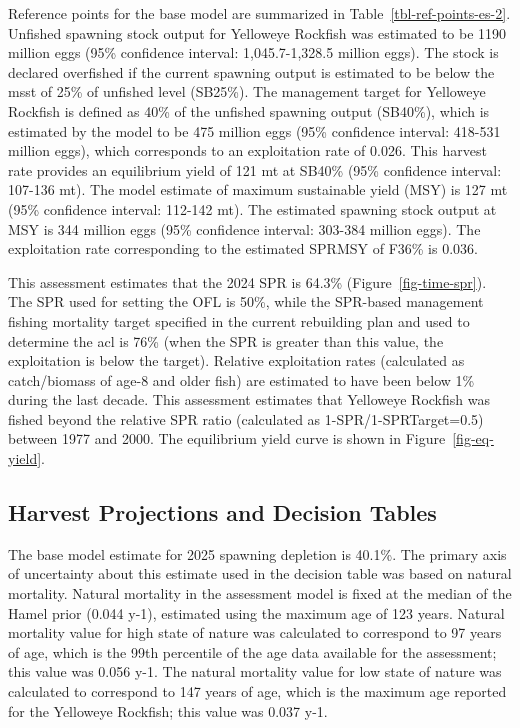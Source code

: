 \documentclass[
]{scrartcl}
\begin{document}
Reference points for the base model are summarized in
Table~\ref{tbl-ref-points-es-2}. Unfished spawning stock output for
Yelloweye Rockfish was estimated to be 1190 million eggs (95\%
confidence interval: 1,045.7-1,328.5 million eggs). The stock is
declared overfished if the current spawning output is estimated to be
below the \gls{msst} of 25\% of unfished level (SB25\%). The management
target for Yelloweye Rockfish is defined as 40\% of the unfished
spawning output (SB40\%), which is estimated by the model to be 475
million eggs (95\% confidence interval: 418-531 million eggs), which
corresponds to an exploitation rate of 0.026. This harvest rate provides
an equilibrium yield of 121 mt at SB40\% (95\% confidence interval:
107-136 mt). The model estimate of maximum sustainable yield (MSY) is
127 mt (95\% confidence interval: 112-142 mt). The estimated spawning
stock output at MSY is 344 million eggs (95\% confidence interval:
303-384 million eggs). The exploitation rate corresponding to the
estimated SPRMSY of F36\% is 0.036.

This assessment estimates that the 2024 SPR is 64.3\%
(Figure~\ref{fig-time-spr}). The SPR used for setting the OFL is 50\%,
while the SPR-based management fishing mortality target specified in the
current rebuilding plan and used to determine the \gls{acl} is 76\%
(when the SPR is greater than this value, the exploitation is below the
target). Relative exploitation rates (calculated as catch/biomass of
age-8 and older fish) are estimated to have been below 1\% during the
last decade. This assessment estimates that Yelloweye Rockfish was
fished beyond the relative SPR ratio (calculated as
1-SPR/1-SPRTarget=0.5) between 1977 and 2000. The equilibrium yield
curve is shown in Figure~\ref{fig-eq-yield}.

\subsection{Harvest Projections and Decision
Tables}\label{harvest-projections-and-decision-tables}

The base model estimate for 2025 spawning depletion is 40.1\%. The
primary axis of uncertainty about this estimate used in the decision
table was based on natural mortality. Natural mortality in the
assessment model is fixed at the median of the Hamel prior (0.044 y-1),
estimated using the maximum age of 123 years. Natural mortality value
for high state of nature was calculated to correspond to 97 years of
age, which is the 99th percentile of the age data available for the
assessment; this value was 0.056 y-1. The natural mortality value for
low state of nature was calculated to correspond to 147 years of age,
which is the maximum age reported for the Yelloweye Rockfish; this value
was 0.037 y-1.
\end{document}
